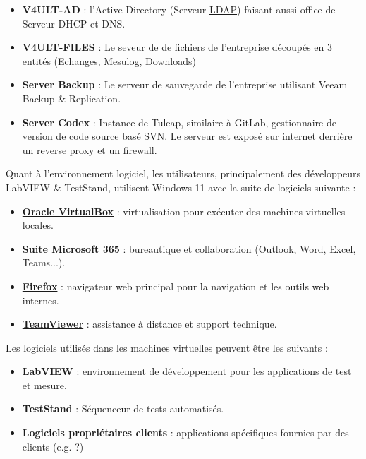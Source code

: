 \documentclass[a4paper, 11pt]{article}
\begin{document}
 \begin{itemize}
  \item[$\bullet$] \textbf{V4ULT-AD} : l'Active Directory (Serveur \href{https://fr.wikipedia.org/wiki/LDAP}{LDAP}) faisant aussi office de Serveur DHCP et DNS.
  \item[$\bullet$] \textbf{V4ULT-FILES} : Le seveur de de fichiers de l'entreprise découpés en 3 entités (Echanges, Mesulog, Downloads)
  \item[$\bullet$] \textbf{Server Backup} : Le serveur de sauvegarde de l'entreprise utilisant Veeam Backup \& Replication.
  \item[$\bullet$] \textbf{Server Codex} : Instance de Tuleap, similaire à GitLab, gestionnaire de version de code source basé SVN. Le serveur est exposé sur internet derrière un reverse proxy et un firewall.
 \end{itemize}
\par\bigskip
Quant à l'environnement logiciel, les utilisateurs, principalement des développeurs LabVIEW \& TestStand, utilisent Windows 11 avec la suite de logiciels suivante :
\par\bigskip

\begin{itemize}
  \item[$\bullet$] \textbf{\href{https://www.virtualbox.org/}{Oracle VirtualBox}} : virtualisation pour exécuter des machines virtuelles locales.
  \item[$\bullet$] \textbf{\href{https://www.microsoft.com/fr-fr/microsoft-365/}{Suite Microsoft 365}} : bureautique et collaboration (Outlook, Word, Excel, Teams...).
  \item[$\bullet$] \textbf{\href{https://www.mozilla.org/fr/firefox/}{Firefox}} : navigateur web principal pour la navigation et les outils web internes.
  \item[$\bullet$] \textbf{\href{https://www.teamviewer.com/}{TeamViewer}} : assistance à distance et support technique.
\end{itemize}
\par\bigskip

Les logiciels utilisés dans les machines virtuelles peuvent être les suivants :
\par\bigskip

\begin{itemize}
  \item[$\bullet$] \textbf{LabVIEW} : environnement de développement pour les applications de test et mesure.
  \item[$\bullet$] \textbf{TestStand} : Séquenceur de tests automatisés.
  \item[$\bullet$] \textbf{Logiciels propriétaires clients} : applications spécifiques fournies par des clients (e.g. ?)
\end{itemize}
\end{document}
